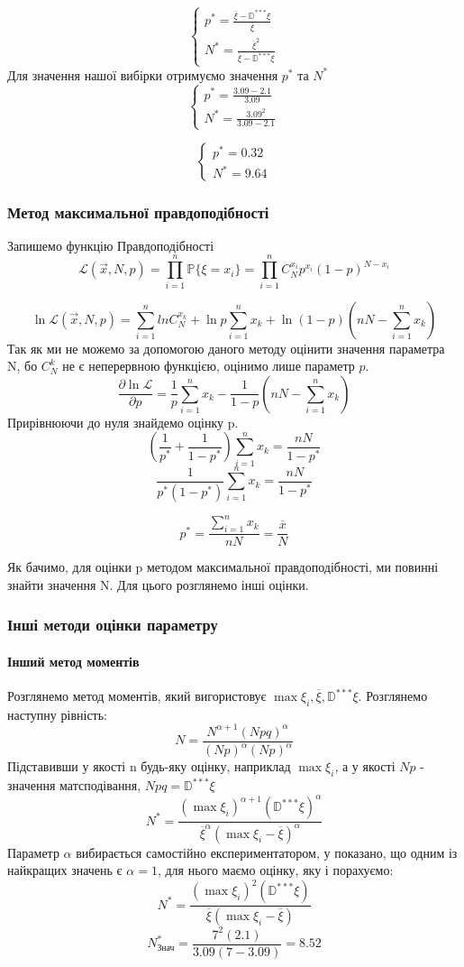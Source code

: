 \documentclass{article}
\begin{document}
$$
\begin{cases}
    p^* = \frac{\overline{\xi} - \mathbb{D}^{***}\xi}{\overline{\xi}}\\
    N^* = \frac{\overline{\xi}^2}{\overline{\xi} - \mathbb{D}^{***}\xi}
\end{cases}
$$
Для значення нашої вибірки отримуємо значення $p^*$ та $N^*$
$$
\begin{cases}
    p^* = \frac{3.09 - 2.1}{3.09} \\
    N^* = \frac{3.09^2}{3.09 - 2.1} 
\end{cases}
$$

$$
\begin{cases}
    p^* = 0.32 \\ 
    N^* = 9.64 
\end{cases}
$$

\subsubsection{Метод максимальної правдоподібності}
Запишемо функцію Правдоподібності
$$
\mathcal{L}(\overrightarrow{x}, N, p) = \prod_{i=1}^{n} \mathbb{P} \{ \xi=x_i \} =  \prod_{i=1}^{n}
C_N^{x_i} p^{x_i} (1-p)^{N-x_i}
$$

$$
\ln\mathcal{L}(\overrightarrow{x}, N, p) = \sum_{i=1}^n lnC_N^{x_k} + \ln p \sum_{i=1}^n x_k +
\ln(1-p)\left( nN -  \sum_{i=1}^n x_k \right)
$$
Так як ми не можемо за допомогою даного методу оцінити значення параметра N, бо $C_N^k$ не є
неперервною функцією, оцінимо лише параметр $p$.
$$
\frac{\partial \ln\mathcal{L}}{\partial p} = \frac{1}{p} \sum_{i=1}^n x_k - \frac{1}{1-p} \left(nN -
\sum_{i=1}^n x_k\right)
$$
Прирівнюючи до нуля знайдемо оцінку p.
$$
(\frac{1}{p^*}+ \frac{1}{1-p^*})\sum_{i=1}^n x_k = \frac{nN}{1-p^*}
$$
$$
\frac{1}{p^*(1-p^*)} \sum_{i=1}^n x_k = \frac{nN}{1-p^*}
$$

$$
p^* = \frac{\sum_{i=1}^n x_k}{nN} = \frac{\overline{x}}{N}
$$

Як бачимо, для оцінки p методом максимальної правдоподібності, ми повинні знайти значення N. Для
цього розглянемо інші оцінки.
\subsubsection{Інші методи оцінки параметру}
\paragraph{Інший метод моментів}
Розглянемо метод моментів, який вигористовує $\max{\xi_i}, \overline\xi, \mathbb{D}^{***}\xi$.
Розглянемо наступну рівність:
$$
N = \frac{N^{\alpha + 1} (Npq)^{\alpha}}{(Np)^\alpha (Np)^\alpha}
$$
Підставивши у якості n будь-яку оцінку, наприклад $\max\xi_i$, а у якості $Np$ - значення
матсподівання, $Npq = \mathbb{D}^{***}\xi$
$$
N^*=\frac{(\max\xi_i)^{\alpha+1}(\mathbb{D}^{***}\xi)^\alpha}{{\overline{\xi}}^\alpha(\max\xi_i -
\overline\xi)^\alpha}
$$
Параметр $\alpha$ вибирається самостійно експериментатором, у \cite{1} показано, що одним із найкращих
значень є $ \alpha = 1 $, для нього маємо оцінку, яку і порахуємо:
$$
N^* = \frac{(\max\xi_i)^2(\mathbb{D}^{***}\xi)}{{\overline{\xi}}(\max\xi_i -
\overline\xi)}
$$
$$
N^*_{\textrm{Знач}} = \frac{7^2 (2.1)}{3.09(7 - 3.09)} = 8.52 
$$
\end{document}
